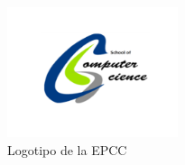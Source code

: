\begin{figure}
\begin{center}
\includegraphics[angle=45, width=5cm]{Graficos/escuela}
\caption{Logotipo de la EPCC}
\end{center}
\end{figure}
